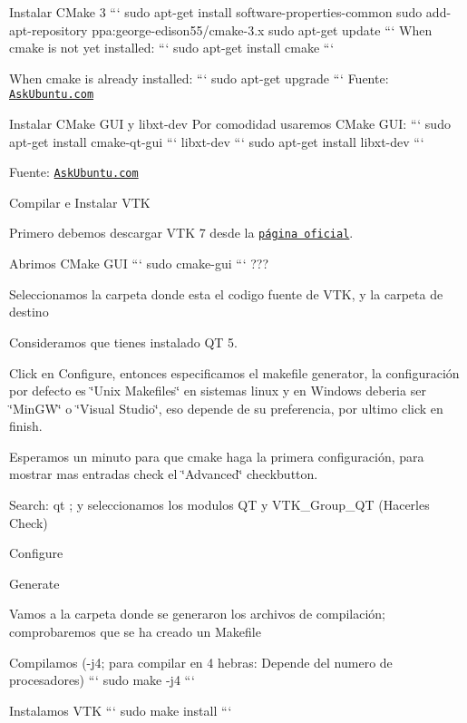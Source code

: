\begin{DoxyEnumerate}
\item Instalar C\+Make 3 ``` sudo apt-\/get install software-\/properties-\/common sudo add-\/apt-\/repository ppa\+:george-\/edison55/cmake-\/3.\+x sudo apt-\/get update ``` When cmake is not yet installed\+: ``` sudo apt-\/get install cmake ```

When cmake is already installed\+: ``` sudo apt-\/get upgrade ``` Fuente\+: \href{http://askubuntu.com/questions/610291/how-to-install-cmake-3-2-on-ubuntu-14-04}{\tt Ask\+Ubuntu.\+com}
\item Instalar C\+Make G\+UI y libxt-\/dev Por comodidad usaremos C\+Make G\+UI\+: ``` sudo apt-\/get install cmake-\/qt-\/gui ``` libxt-\/dev ``` sudo apt-\/get install libxt-\/dev ```

Fuente\+: \href{http://askubuntu.com/questions/121797/how-do-i-install-ccmake}{\tt Ask\+Ubuntu.\+com}
\item Compilar e Instalar V\+TK
\begin{DoxyItemize}
\item Primero debemos descargar V\+TK 7 desde la \href{http://www.vtk.org/download/}{\tt página oficial}.
\item Abrimos C\+Make G\+UI ``` sudo cmake-\/gui ``` ???
\item Seleccionamos la carpeta donde esta el codigo fuente de V\+TK, y la carpeta de destino
\item Consideramos que tienes instalado QT 5.
\item Click en Configure, entonces especificamos el makefile generator, la configuración por defecto es \char`\"{}\+Unix Makefiles\char`\"{} en sistemas linux y en Windows deberia ser \char`\"{}\+Min\+G\+W\char`\"{} o \char`\"{}\+Visual Studio\char`\"{}, eso depende de su preferencia, por ultimo click en finish.
\item Esperamos un minuto para que cmake haga la primera configuración, para mostrar mas entradas check el \char`\"{}\+Advanced\char`\"{} checkbutton.
\item Search\+: qt ; y seleccionamos los modulos QT y V\+T\+K\+\_\+\+Group\+\_\+\+QT (Hacerles Check) 
\item Configure
\item Generate
\item Vamos a la carpeta donde se generaron los archivos de compilación; comprobaremos que se ha creado un Makefile
\item Compilamos (-\/j4; para compilar en 4 hebras\+: Depende del numero de procesadores) ``` sudo make -\/j4 ```
\item Instalamos V\+TK ``` sudo make install ```
\end{DoxyItemize}
\end{DoxyEnumerate}

